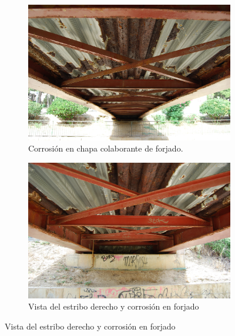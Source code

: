 \documentclass[a4paper,11pt ]{xc_webpage_project}
\renewcommand{\widhtLeftCol}{0.50\textwidth} %
\renewcommand{\widhtRigthCol}{0.45\textwidth} %
\begin{document}
\begin{figure}[h]
  \begin{subfigure}[l]{\widhtLeftCol}
  \centering
  \includegraphics[width=\textwidth]{figures/corrosion_fisura_transversal_zona_estribo_derecho}
  \caption{Corrosión en chapa colaborante de forjado.}
  \end{subfigure}
\hfill
  \begin{subfigure}[r]{\widhtRigthCol}
  \centering
  \includegraphics[width=\textwidth]{figures/corrosion_forjado_zona_central_y_laterales}
  \caption{Vista del estribo derecho y corrosión en forjado}
  \end{subfigure}
  \end{figure}


\end{document}
